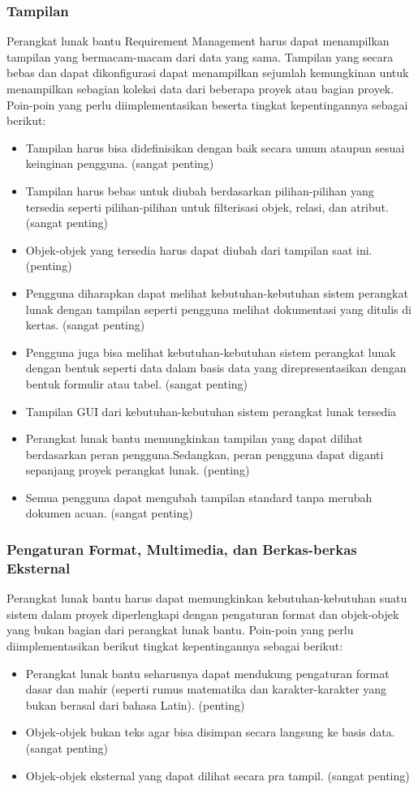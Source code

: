 \subsubsection{Tampilan}
Perangkat lunak bantu Requirement Management harus dapat menampilkan tampilan yang bermacam-macam dari data yang sama. Tampilan yang secara bebas dan dapat dikonfigurasi dapat menampilkan sejumlah kemungkinan untuk menampilkan sebagian koleksi data dari beberapa proyek atau bagian proyek. Poin-poin yang perlu diimplementasikan beserta tingkat kepentingannya sebagai berikut:
\begin{itemize}
\item Tampilan harus bisa didefinisikan dengan baik secara umum ataupun sesuai keinginan pengguna. (sangat penting)
\item	Tampilan harus bebas untuk diubah berdasarkan pilihan-pilihan yang tersedia seperti pilihan-pilihan untuk filterisasi objek, relasi, dan atribut. (sangat penting)
\item	Objek-objek yang tersedia harus dapat diubah dari tampilan saat ini. (penting)
\item	Pengguna diharapkan dapat melihat kebutuhan-kebutuhan sistem perangkat lunak dengan tampilan seperti pengguna melihat dokumentasi yang ditulis di kertas. (sangat penting)
\item	Pengguna juga bisa melihat kebutuhan-kebutuhan sistem perangkat lunak dengan bentuk seperti data dalam basis data yang direpresentasikan dengan bentuk formulir atau tabel. (sangat penting)
\item	Tampilan GUI dari kebutuhan-kebutuhan sistem perangkat lunak tersedia 
\item	Perangkat lunak bantu memungkinkan tampilan yang dapat dilihat berdasarkan peran pengguna.Sedangkan, peran pengguna dapat diganti sepanjang proyek perangkat lunak. (penting)
\item	Semua pengguna dapat mengubah tampilan standard tanpa merubah dokumen acuan. (sangat penting)
\end{itemize}

\subsubsection{Pengaturan Format, Multimedia, dan Berkas-berkas Eksternal}
Perangkat lunak bantu harus dapat memungkinkan kebutuhan-kebutuhan suatu sistem dalam proyek diperlengkapi dengan pengaturan format dan objek-objek yang bukan bagian dari perangkat lunak bantu. Poin-poin yang perlu diimplementasikan berikut tingkat kepentingannya sebagai berikut:
\begin{itemize}
\item	Perangkat lunak bantu seharusnya dapat mendukung pengaturan format dasar dan mahir (seperti rumus matematika dan karakter-karakter yang bukan berasal dari bahasa Latin). (penting)
\item	Objek-objek bukan teks agar bisa disimpan secara langsung ke basis data. (sangat penting)
\item	Objek-objek eksternal yang dapat dilihat secara pra tampil. (sangat penting)
\end{itemize}

